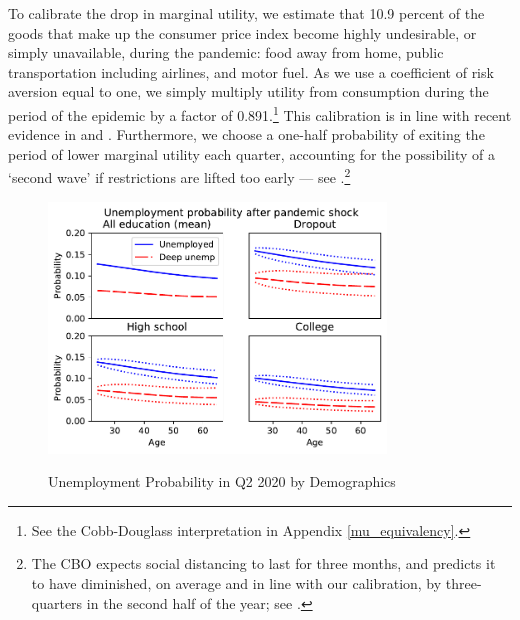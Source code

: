 \documentclass[titlepage,a4paper]{\econtex}
\begin{document}
To calibrate the drop in marginal utility, we estimate that 10.9 percent of the goods that make up the consumer price index become highly undesirable, or simply unavailable, during the pandemic: food away from home, public transportation including airlines, and motor fuel.
As we use a coefficient of risk aversion equal to one, we simply multiply utility from consumption during the period of the epidemic by a factor of 0.891.\footnote{See the Cobb-Douglass interpretation in Appendix \ref{mu_equivalency}.} 
This calibration is in line with recent evidence in \cite{covidC_chase} and \cite{chetty_covidC}.
Furthermore, we choose a one-half probability of exiting the period of lower marginal utility each quarter, accounting for the possibility of a `second wave' if restrictions are lifted too early --- see \cite{cyranoski_we_2020}.\footnote{The CBO expects social distancing to last for three months, and predicts it to have diminished, on average and in line with our calibration, by three-quarters in the second half of the year; see \cite{SwagelCBO2020}.}

\hypertarget{unemployment-demographics}{}
\begin{figure}
  \centering
  \caption{Unemployment Probability in Q2 2020 by Demographics}
  \label{unemployment_demographics}
  { \includegraphics[width=0.8\textwidth]{./Figures/UnempProbByDemogBasic}}
\end{figure}
\end{document}
